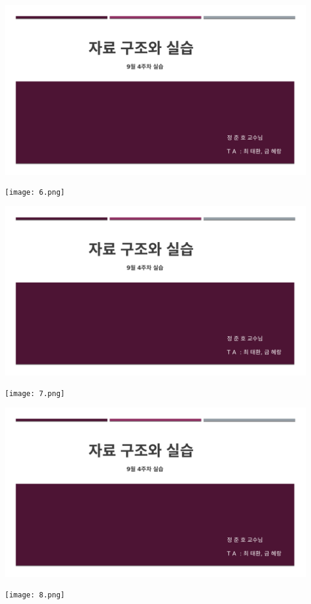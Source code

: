 \documentclass[11pt,a4paper]{article}
\begin{document}
\includegraphics[page=4, width=\textwidth]{1.pdf}
	
\texttt{[image: 6.png]}	


\includegraphics[page=5, width=\textwidth]{1.pdf}
	
\texttt{[image: 7.png]}	


\includegraphics[page=6, width=\textwidth]{1.pdf}
	
\texttt{[image: 8.png]}	
\end{document}
